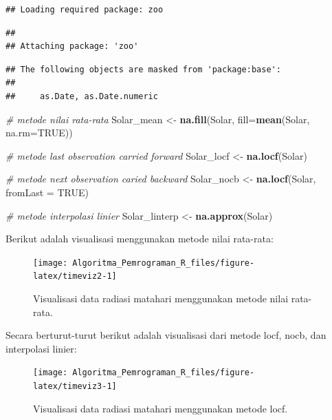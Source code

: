 \documentclass[
]{book}
\newenvironment{Shaded}{\begin{snugshade}}{\end{snugshade}}
\newcommand{\AttributeTok}[1]{\textcolor[rgb]{0.13,0.29,0.53}{#1}}
\newcommand{\CommentTok}[1]{\textcolor[rgb]{0.56,0.35,0.01}{\textit{#1}}}
\newcommand{\ConstantTok}[1]{\textcolor[rgb]{0.56,0.35,0.01}{#1}}
\newcommand{\FunctionTok}[1]{\textcolor[rgb]{0.13,0.29,0.53}{\textbf{#1}}}
\newcommand{\NormalTok}[1]{#1}
\newcommand{\OtherTok}[1]{\textcolor[rgb]{0.56,0.35,0.01}{#1}}
\theoremstyle{definition}
\theoremstyle{definition}
\theoremstyle{definition}
\theoremstyle{definition}
\theoremstyle{remark}
\begin{document}
\begin{verbatim}
## Loading required package: zoo
\end{verbatim}

\begin{verbatim}
## 
## Attaching package: 'zoo'
\end{verbatim}

\begin{verbatim}
## The following objects are masked from 'package:base':
## 
##     as.Date, as.Date.numeric
\end{verbatim}

\begin{Shaded}
\begin{Highlighting}[]
\CommentTok{\# metode nilai rata{-}rata}
\NormalTok{Solar\_mean }\OtherTok{\textless{}{-}} \FunctionTok{na.fill}\NormalTok{(Solar, }\AttributeTok{fill=}\FunctionTok{mean}\NormalTok{(Solar, }\AttributeTok{na.rm=}\ConstantTok{TRUE}\NormalTok{))}

\CommentTok{\# metode last observation carried forward}
\NormalTok{Solar\_locf }\OtherTok{\textless{}{-}} \FunctionTok{na.locf}\NormalTok{(Solar)}

\CommentTok{\# metode next observation caried backward}
\NormalTok{Solar\_nocb }\OtherTok{\textless{}{-}} \FunctionTok{na.locf}\NormalTok{(Solar, }\AttributeTok{fromLast =} \ConstantTok{TRUE}\NormalTok{)}

\CommentTok{\# metode interpolasi linier}
\NormalTok{Solar\_linterp }\OtherTok{\textless{}{-}} \FunctionTok{na.approx}\NormalTok{(Solar)}
\end{Highlighting}
\end{Shaded}

Berikut adalah visualisasi menggunakan metode nilai rata-rata:

\begin{figure}

{\centering \texttt{[image: Algoritma\_Pemrograman\_R\_files/figure-latex/timeviz2-1]} 

}

\caption{Visualisasi data radiasi matahari menggunakan metode nilai rata-rata.}\label{fig:timeviz2}
\end{figure}

Secara berturut-turut berikut adalah visualisasi dari metode locf, nocb, dan interpolasi linier:

\begin{figure}

{\centering \texttt{[image: Algoritma\_Pemrograman\_R\_files/figure-latex/timeviz3-1]} 

}

\caption{Visualisasi data radiasi matahari menggunakan metode locf.}\label{fig:timeviz3}
\end{figure}
\end{document}
